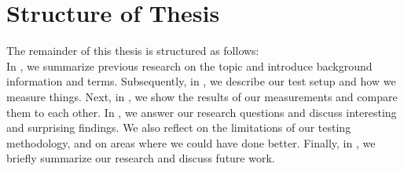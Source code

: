 \section{Structure of Thesis}
The remainder of this thesis is structured as follows:\\
In , we summarize previous research on the topic and introduce background information and terms.
Subsequently, in , we describe our test setup and how we measure things.
Next, in , we show the results of our measurements and compare them to each other.
In , we answer our research questions and discuss interesting and surprising findings.
We also reflect on the limitations of our testing methodology, and on areas where we could have done better.
Finally, in , we briefly summarize our research and discuss future work.


